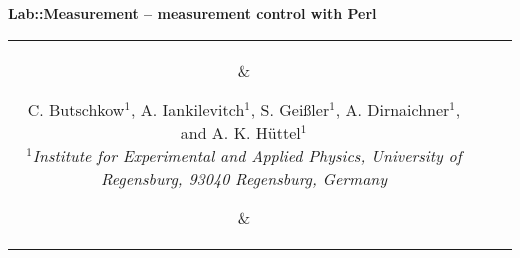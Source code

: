 \documentclass[portrait]{a0poster}
\begin{document}
\color{text}
\Large
%
\newlength{\seplength}
\newlength{\headerheight}
\newlength{\columnheight}
\newlength{\columnheighta}
\newlength{\columnheightb}
%
\setlength{\columnheight}{104cm}           %
\setlength{\columnheighta}{\columnheight-6cm}
\setlength{\columnheightb}{\columnheight+6.5cm}
\setlength{\columnwidth}{0.31\textwidth}   %
%
\setlength{\fboxsep}{10mm}
\setlength{\fboxrule}{0mm}
%
%
%
%
\hspace*{-1cm}\begin{minipage}[t][][t]{\textwidth-2\fboxsep-8\fboxrule}
\color{invheading}
\begin{center}
{
\VERYHuge \vspace*{-0.6cm}
\textsf{\textbf{
Lab::Measurement -- measurement control with Perl
}}
}
\\[\baselineskip]
\begin{tabular}{ccc}
\parbox{5cm}{\vspace*{-1cm}
\begin{center}
\end{center}
}
&
\parbox{70cm}{
\begin{center} 
{
\vspace*{-0.5cm}
\huge 
C. Butschkow$^1$, A. Iankilevitch$^1$, S. Gei\ss{}ler$^1$, A. Dirnaichner$^1$, 
and A. K. Hüttel$^1$
}
\\[\medskipamount]
\it 
\Large
$^1$Institute for Experimental and Applied
Physics, University of Regensburg, 93040 Regensburg, Germany\\
\end{center}
\vspace*{0.5cm}
}
&
\parbox{5cm}{\vspace*{-1cm}
\begin{center}
\end{center}
}
\end{tabular}
\end{center}
\end{minipage}
\vspace*{9mm}
\end{document}
